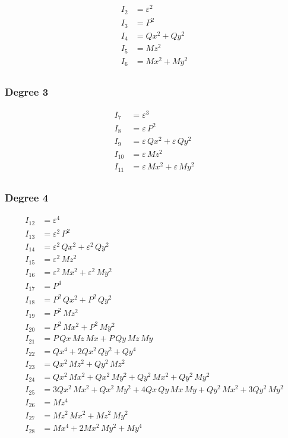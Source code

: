 \documentclass{article}
\begin{document}
\begin{align*}
I_{2} &= ε^{2} \\
I_{3} &= P^{2} \\
I_{4} &= Qx^{2} + Qy^{2} \\
I_{5} &= Mz^{2} \\
I_{6} &= Mx^{2} + My^{2} \\
\end{align*}

\subsubsection*{Degree 3}

\begin{align*}
I_{7} &= ε^{3} \\
I_{8} &= ε\,P^{2} \\
I_{9} &= ε\,Qx^{2} + ε\,Qy^{2} \\
I_{10} &= ε\,Mz^{2} \\
I_{11} &= ε\,Mx^{2} + ε\,My^{2} \\
\end{align*}

\subsubsection*{Degree 4}

\begin{align*}
I_{12} &= ε^{4} \\
I_{13} &= ε^{2}\,P^{2} \\
I_{14} &= ε^{2}\,Qx^{2} + ε^{2}\,Qy^{2} \\
I_{15} &= ε^{2}\,Mz^{2} \\
I_{16} &= ε^{2}\,Mx^{2} + ε^{2}\,My^{2} \\
I_{17} &= P^{4} \\
I_{18} &= P^{2}\,Qx^{2} + P^{2}\,Qy^{2} \\
I_{19} &= P^{2}\,Mz^{2} \\
I_{20} &= P^{2}\,Mx^{2} + P^{2}\,My^{2} \\
I_{21} &= P\,Qx\,Mz\,Mx + P\,Qy\,Mz\,My \\
I_{22} &= Qx^{4} + 2Qx^{2}\,Qy^{2} + Qy^{4} \\
I_{23} &= Qx^{2}\,Mz^{2} + Qy^{2}\,Mz^{2} \\
I_{24} &= Qx^{2}\,Mx^{2} + Qx^{2}\,My^{2} + Qy^{2}\,Mx^{2} + Qy^{2}\,My^{2} \\
I_{25} &= 3Qx^{2}\,Mx^{2} + Qx^{2}\,My^{2} + 4Qx\,Qy\,Mx\,My + Qy^{2}\,Mx^{2} + 3Qy^{2}\,My^{2} \\
I_{26} &= Mz^{4} \\
I_{27} &= Mz^{2}\,Mx^{2} + Mz^{2}\,My^{2} \\
I_{28} &= Mx^{4} + 2Mx^{2}\,My^{2} + My^{4} \\
\end{align*}
\end{document}
